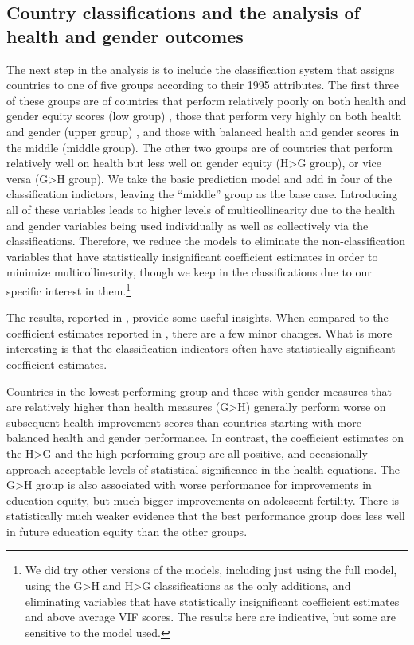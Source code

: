 \documentclass[12pt]{article}
\begin{document}
\subsection{Country classifications and the analysis of health and gender outcomes}

The next step in the analysis is to include the classification system that assigns countries to one of five groups according to their 1995 attributes. The first three of these groups are of countries that perform relatively poorly on both health and gender equity scores (low group) , those that perform very highly on both health and gender (upper group) , and those with balanced health and gender scores in the middle (middle group).  The other two groups are of countries that perform relatively well on health but less well on gender equity (H>G group), or vice versa (G>H group). We take the basic prediction model and add in four of the classification indictors, leaving the \enquote{middle} group as the base case. Introducing all of these variables leads to higher levels of multicollinearity due to the health and gender variables being used individually as well as collectively via the classifications. Therefore, we reduce the models to eliminate the non-classification variables that have statistically insignificant coefficient estimates in order to minimize multicollinearity, though we keep in the classifications due to our specific interest in them.\footnote{
We did try other versions of the models, including just using the full model, using the G>H and H>G classifications as the only additions, and eliminating variables that have statistically insignificant coefficient estimates and above average VIF scores. The results here are indicative, but some are sensitive to the model used.}



The results, reported in , provide some useful insights. When compared to the coefficient estimates reported in , there are a few minor changes. What is more interesting is that the classification indicators often have statistically significant coefficient estimates.

Countries in the lowest performing group and those with gender measures that are relatively higher than health measures (G>H) generally perform worse on subsequent health improvement scores than countries starting with more balanced health and gender performance. In contrast, the coefficient estimates on the H>G and the high-performing group are all positive, and occasionally approach acceptable levels of statistical significance in the health equations. The G>H group is also associated with worse performance for improvements in education equity, but much bigger improvements on adolescent fertility. There is statistically much weaker evidence that the best performance group does less well in future education equity than the other groups.
\end{document}
